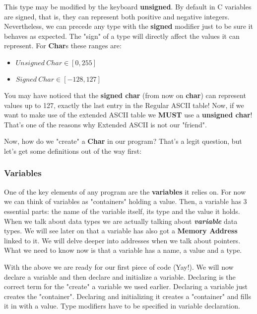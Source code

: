 \documentclass[12pt]{book}
\begin{document}
This type may be modified by the keyboard \textbf{unsigned}. By default in C variables are signed, that is, they can represent both positive and negative integers. Nevertheless, we can precede any type with the \textbf{signed} modifier just to be sure it behaves as expected. The "sign" of a type will directly affect the values it can represent. For \textbf{Char}s these ranges are:
\begin{itemize}
  \item $Unsigned\ Char \in [0, 255]$
  \item $Signed\ Char \in [-128, 127]$
\end{itemize}

You may have noticed that the \textbf{signed char} (from now on \textbf{char}) can represent values up to 127, exactly the last entry in the Regular ASCII table! Now, if we want to make use of the extended ASCII table we \textbf{MUST} use a \textbf{unsigned char}! That's one of the reasons why Extended ASCII is not our "friend".

Now, how do we "create" a \textbf{Char} in our program? That's a legit question, but let's get some definitions out of the way first:

\subsubsection{Variables} %

One of the key elements of any program are the \textbf{variables} it relies on. For now we can think of variables as "containers" holding a value. Then, a variable has 3 essential parts: the name of the variable itself, its type and the value it holds. When we talk about data types we are actually talking about \textit{\textbf{variable}} data types. We will see later on that a variable has also got a \textbf{Memory Address} linked to it. We will delve deeper into addresses when we talk about pointers. What we need to know now is that a variable has a name, a value and a type.


With the above we are ready for our first piece of code (Yay!). We will now declare a variable and then declare and initialize a variable. Declaring is the correct term for the "create" a variable we used earlier. Declaring a variable just creates the "container". Declaring and initializing it creates a "container" and fills it in with a value. Type modifiers have to be specified in variable declaration.
\end{document}
